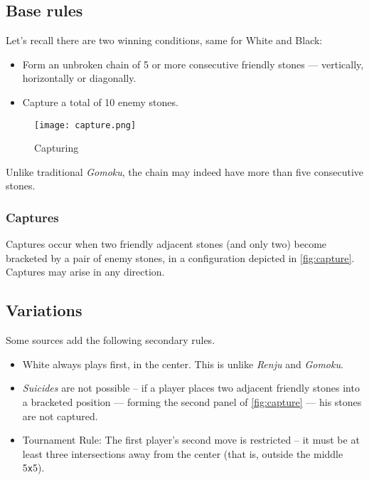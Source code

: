 \documentclass[12pt,a4paper,notitlepage]{article}
\newcommand*{\boardsize}[1]{#1\texttt{x}#1}
\begin{document}
\subsection{Base rules}

Let's recall there are two winning conditions, same for White and Black:

\begin{itemize}
	\large
	\item Form an unbroken chain of 5 or more consecutive friendly stones --- vertically, horizontally or diagonally.
	\item Capture a total of 10 enemy stones.
\end{itemize}

\begin{wrapfigure}[8]{r}[2em]{0.3\textwidth}
	\vspace*{-3\baselineskip}
	\texttt{[image: capture.png]}
	\caption{Capturing\supercite{pente-net} \label{fig:capture}}
\end{wrapfigure}

Unlike traditional \textit{Gomoku}, the chain may indeed have more than five consecutive stones.

\subsubsection{Captures}

Captures occur when two friendly adjacent stones (and only two) become bracketed by a pair of enemy stones, in a configuration depicted in \autoref{fig:capture}. Captures may arise in any direction.

\subsection{Variations}

Some sources add the following secondary rules.

\begin{itemize}
	\item White always plays first, in the center.\supercite{pente-renjunu, pente-wikipedia} This is unlike \textit{Renju} and \textit{Gomoku}.
	\item \textsl{Suicides} are not possible -- if a player places two adjacent friendly stones into a bracketed position --- forming the second panel of \autoref{fig:capture} --- his stones are not captured.\supercite{pente-renjunu,pente-org,pente-wikipedia,pente-winning-moves}
	\item Tournament Rule: The first player's second move is restricted -- it must be at least three intersections away from the center (that is, outside the middle \boardsize{5}).\supercite{pente-net,pente-org,pente-wikipedia,pente-winning-moves}
\end{itemize}
\end{document}
